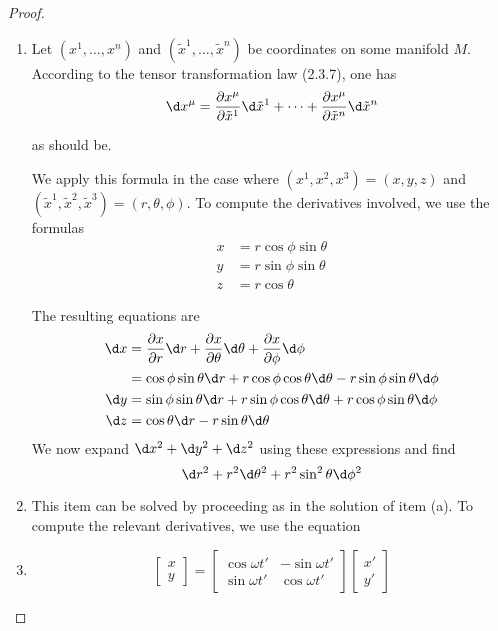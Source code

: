 \begin{proof}\leavevmode
    \begin{enumerate}[label=(\alph*)]
        \item Let $( x^1, \ldots , x^n) $ and $( \tilde{x} ^1, \ldots , \tilde{x}^n) $ be coordinates on some manifold $M$. According to the tensor transformation law (2.3.7), one has
        \[
        \d x^{\mu}=\pdv{x^{\mu}}{\tilde{x}^1}\d\tilde{x}^1+\cdots+\pdv{x^\mu}{\tilde{x}^n}\d\tilde{x}^n
        \]
         
        as should be.

        We apply this formula in the case where $(x^1,x^2,x^3)=(x,y,z)$ and $(\tilde{x}^1,\tilde{x}^2,\tilde{x}^3)=(r,\theta,\phi)$. To compute the derivatives involved, we use the formulas
        \[\begin{aligned}
            x&=r\cos\phi\sin\theta\\
            y&=r\sin\phi\sin\theta\\
            z&=r\cos\theta
        \end{aligned}
        \]
        
        The resulting equations are
        \[
            \begin{aligned}
            \d x&=\pdv xr\d r+\pdv x\theta\d\theta+\pdv x\phi\d\phi\\
            &=\cos\phi\sin\theta\d r+r\cos\phi\cos\theta\d\theta-r\sin\phi\sin\theta\d\phi\\
            \d y&=\sin\phi\sin\theta\d r+r\sin\phi\cos\theta\d\theta+r\cos\phi\sin\theta\d\phi\\
            \d z&=\cos\theta\d r-r\sin\theta\d\theta
            \end{aligned}
        \]
        We now expand $\d x^2+\d y^2+\d z^2$ using these expressions and find
        \[
        \d r^{2}+r^{2}\d\theta^{2}+r^{2}\sin^{2}\theta\d\phi^{2}
        \]
        \item This item can be solved by proceeding as in the solution of item (a). To compute the relevant derivatives, we use the equation
        \item 
        \[\begin{bmatrix}
            x\\y
        \end{bmatrix}=
        \begin{bmatrix}
            \cos\omega t'&-\sin\omega t'\\
            \sin\omega t'&\cos\omega t'
        \end{bmatrix}
        \begin{bmatrix}
            x'\\y'
        \end{bmatrix}\]


\end{enumerate}
\end{proof}
